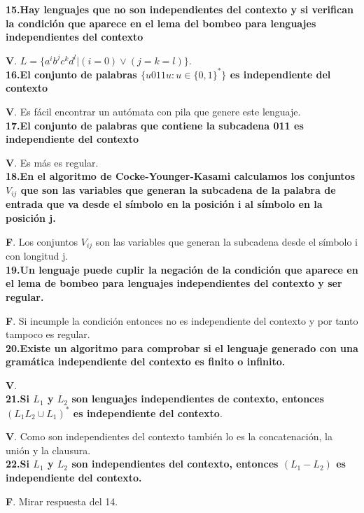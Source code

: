 \documentclass[a4paper,11pt]{article}
\begin{document}
\textbf{15.Hay lenguajes que no son independientes del contexto y si verifican la condición que aparece en el lema del bombeo para lenguajes independientes del contexto}

\textbf{V}. $L=\{a^ib^jc^kd^l|(i=0)\lor (j=k=l)\}$. \\

\textbf{16.El conjunto de palabras $\{u011u:u\in \{0,1\}^*\}$ es independiente del contexto}

\textbf{V}. Es fácil encontrar un autómata con pila que genere este lenguaje.\\

\textbf{17.El conjunto de palabras que contiene la subcadena 011 es independiente del contexto}

\textbf{V}. Es más es regular. \\

\textbf{18.En el algoritmo de Cocke-Younger-Kasami calculamos los conjuntos $V_{ij}$ que son las variables que generan la subcadena de la palabra de entrada que va desde el símbolo en la posición i al símbolo en la posición j.}

\textbf{F}. Los conjuntos $V_{ij}$ son las variables que generan la subcadena desde el símbolo i con longitud j. \\

\textbf{19.Un lenguaje puede cuplir la negación de la condición que aparece en el lema de bombeo para lenguajes independientes del contexto y ser regular.}

\textbf{F}. Si incumple la condición entonces no es independiente del contexto y por tanto tampoco es regular. \\

\textbf{20.Existe un algoritmo para comprobar si el lenguaje generado con una gramática independiente del contexto es finito o infinito.}

\textbf{V}.\\

\textbf{21.Si $L_1$ y $L_2$ son lenguajes independientes de contexto, entonces $(L_1L_2\cup L_1)^* $ es independiente del contexto}.

\textbf{V}. Como son independientes del contexto también lo es la concatenación, la unión y la clausura. \\

\textbf{22.Si $L_1$ y $L_2$ son independientes del contexto, entonces $(L_1-L_2)$ es independiente del contexto.} 

\textbf{F}. Mirar respuesta del 14. \\
\end{document}
